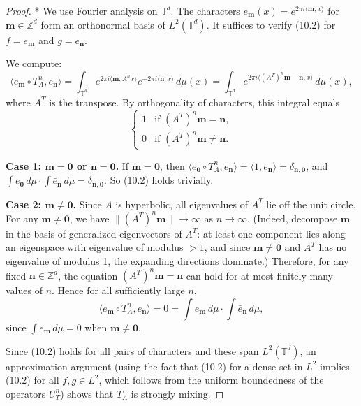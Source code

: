 \begin{proof}
* We use Fourier analysis on $\mathbb{T}^d$. The characters $e_{\mathbf{m}}(x) = e^{2\pi i \langle \mathbf{m}, x \rangle}$ for $\mathbf{m} \in \mathbb{Z}^d$ form an orthonormal basis of $L^2(\mathbb{T}^d)$. It suffices to verify (10.2) for $f = e_{\mathbf{m}}$ and $g = e_{\mathbf{n}}$.

We compute:
\[
\langle e_{\mathbf{m}} \circ T_A^n, e_{\mathbf{n}} \rangle = \int_{\mathbb{T}^d} e^{2\pi i \langle \mathbf{m}, A^n x \rangle} e^{-2\pi i \langle \mathbf{n}, x \rangle} \, d\mu(x) = \int_{\mathbb{T}^d} e^{2\pi i \langle (A^T)^n \mathbf{m} - \mathbf{n}, x \rangle} \, d\mu(x),
\]
where $A^T$ is the transpose. By orthogonality of characters, this integral equals
\[
\begin{cases} 1 & \text{if } (A^T)^n \mathbf{m} = \mathbf{n}, \\ 0 & \text{if } (A^T)^n \mathbf{m} \ne \mathbf{n}. \end{cases}
\]

\textbf{Case 1: $\mathbf{m} = \mathbf{0}$ or $\mathbf{n} = \mathbf{0}$.} If $\mathbf{m} = \mathbf{0}$, then $\langle e_{\mathbf{0}} \circ T_A^n, e_{\mathbf{n}} \rangle = \langle 1, e_{\mathbf{n}} \rangle = \delta_{\mathbf{n}, \mathbf{0}}$, and $\int e_{\mathbf{0}} \, d\mu \cdot \int \bar{e}_{\mathbf{n}} \, d\mu = \delta_{\mathbf{n}, \mathbf{0}}$. So (10.2) holds trivially.

\textbf{Case 2: $\mathbf{m} \ne \mathbf{0}$.} Since $A$ is hyperbolic, all eigenvalues of $A^T$ lie off the unit circle. For any $\mathbf{m} \ne \mathbf{0}$, we have $\|(A^T)^n \mathbf{m}\| \to \infty$ as $n \to \infty$. (Indeed, decompose $\mathbf{m}$ in the basis of generalized eigenvectors of $A^T$: at least one component lies along an eigenspace with eigenvalue of modulus $> 1$, and since $\mathbf{m} \ne \mathbf{0}$ and $A^T$ has no eigenvalue of modulus 1, the expanding directions dominate.) Therefore, for any fixed $\mathbf{n} \in \mathbb{Z}^d$, the equation $(A^T)^n \mathbf{m} = \mathbf{n}$ can hold for at most finitely many values of $n$. Hence for all sufficiently large $n$,
\[
\langle e_{\mathbf{m}} \circ T_A^n, e_{\mathbf{n}} \rangle = 0 = \int e_{\mathbf{m}} \, d\mu \cdot \int \bar{e}_{\mathbf{n}} \, d\mu,
\]
since $\int e_{\mathbf{m}} \, d\mu = 0$ when $\mathbf{m} \ne \mathbf{0}$.

Since (10.2) holds for all pairs of characters and these span $L^2(\mathbb{T}^d)$, an approximation argument (using the fact that (10.2) for a dense set in $L^2$ implies (10.2) for all $f, g \in L^2$, which follows from the uniform boundedness of the operators $U_T^n$) shows that $T_A$ is strongly mixing.
\end{proof}


